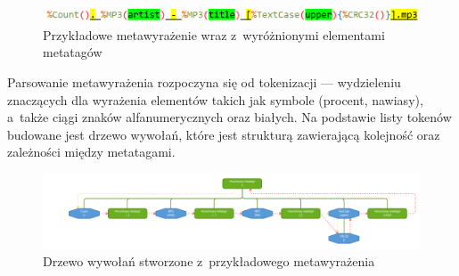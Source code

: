 \begin{figure}[h]
\begin{center}
\includegraphics[scale=0.55]{img/metatag_expr2.png}
\end{center}
\caption{Przykładowe metawyrażenie wraz z~wyróżnionymi elementami metatagów}
\label{metatag-expr}
\end{figure}

\par
Parsowanie metawyrażenia rozpoczyna się od tokenizacji --- wydzieleniu znaczących dla wyrażenia elementów takich jak symbole (procent, nawiasy), a~także ciągi znaków alfanumerycznych oraz białych. Na podstawie listy tokenów budowane jest drzewo wywołań, które jest strukturą zawierającą kolejność oraz zależności między metatagami.

\begin{figure}
\begin{center}
\includegraphics[scale=0.55]{img/metatag_expr_tree4.png}
\end{center}
\caption{Drzewo wywołań stworzone z~przykładowego metawyrażenia}
\label{metatag-expr-tree}
\end{figure}

